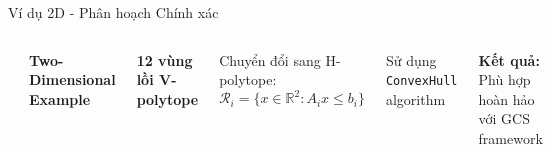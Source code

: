 \documentclass[aspectratio=169]{beamer}
\begin{document}
\begin{frame}{Ví dụ 2D - Phân hoạch Chính xác}
    \begin{columns}[c]
        \includegraphics[width=\textwidth]{../imgs/2d-decompose.png}

        \textbf{Two-Dimensional Example}
        
        \textbf{12 vùng lồi V-polytope}

        \vspace{0.3cm}
        Chuyển đổi sang H-polytope:
        \[
            \mathcal{R}_i = \{x \in \mathbb{R}^2 : A_i x \leq b_i\}
        \]

        \vspace{0.3cm}
        Sử dụng \texttt{ConvexHull} algorithm

        \vspace{0.3cm}
        \textbf{Kết quả:} Phù hợp hoàn hảo với GCS framework
    \end{columns}
\end{frame}
\end{document}
